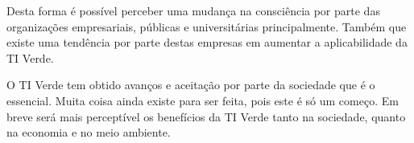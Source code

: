 \documentclass[a4paper, 12pt]{article}
\begin{document}
    \par Desta forma é possível perceber uma mudança na consciência por parte das organizações empresariais, públicas e universitárias principalmente. Também que existe uma tendência por parte destas empresas em aumentar a aplicabilidade da TI Verde.

    \par O TI Verde tem obtido avanços e aceitação por parte da sociedade que é o essencial. Muita coisa ainda existe para ser feita, pois este é só um começo. Em breve será mais perceptível os benefícios da TI Verde tanto na sociedade, quanto na economia e no meio ambiente.
\end{document}
